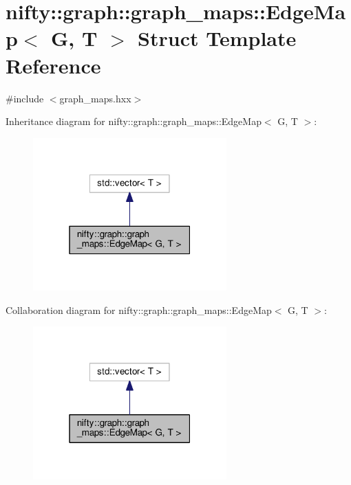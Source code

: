 \hypertarget{structnifty_1_1graph_1_1graph__maps_1_1EdgeMap}{}\section{nifty\+:\+:graph\+:\+:graph\+\_\+maps\+:\+:Edge\+Map$<$ G, T $>$ Struct Template Reference}
\label{structnifty_1_1graph_1_1graph__maps_1_1EdgeMap}


{\ttfamily \#include $<$graph\+\_\+maps.\+hxx$>$}



Inheritance diagram for nifty\+:\+:graph\+:\+:graph\+\_\+maps\+:\+:Edge\+Map$<$ G, T $>$\+:\nopagebreak
\begin{figure}[H]
\begin{center}
\leavevmode
\includegraphics[width=211pt]{structnifty_1_1graph_1_1graph__maps_1_1EdgeMap__inherit__graph}
\end{center}
\end{figure}


Collaboration diagram for nifty\+:\+:graph\+:\+:graph\+\_\+maps\+:\+:Edge\+Map$<$ G, T $>$\+:\nopagebreak
\begin{figure}[H]
\begin{center}
\leavevmode
\includegraphics[width=211pt]{structnifty_1_1graph_1_1graph__maps_1_1EdgeMap__coll__graph}
\end{center}
\end{figure}
